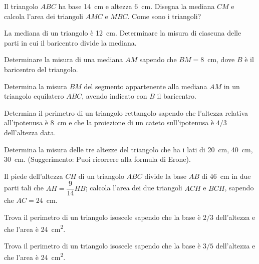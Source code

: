 \begin{multicols}{2}
\begin{esercizio}
\label{ese:7.73}
Il triangolo $ABC$ ha base 14~cm e altezza 6~cm. Disegna la mediana 
$CM$ e calcola l'area dei triangoli $AMC$ e $MBC$. Come sono i 
triangoli?
\end{esercizio}

\begin{esercizio}
\label{ese:7.74}
La mediana di un triangolo è 12~cm. Determinare la misura di ciascuna 
delle parti in cui il baricentro divide la mediana.
\end{esercizio}

\begin{esercizio}
\label{ese:7.75}
Determinare la misura di una mediana $AM$ sapendo che $BM=8$~cm, dove 
$B$ è il baricentro del triangolo.
\end{esercizio}

\begin{esercizio}
\label{ese:7.76}
Determina la misura $BM$ del segmento appartenente alla mediana $AM$ 
in un triangolo equilatero $ABC$, avendo indicato con $B$ il 
baricentro. 
\end{esercizio}

\begin{esercizio}
\label{ese:7.77}
Determina il perimetro di un triangolo rettangolo sapendo che 
l'altezza relativa all'ipotenusa è 8~cm e che la proiezione di un 
cateto sull'ipotenusa è $4/3$ dell'altezza data.
\end{esercizio}

\begin{esercizio}
\label{ese:7.78}
Determina la misura delle tre altezze del triangolo che ha i lati di 
20~cm, 40~cm, 30~cm. (Suggerimento: Puoi ricorrere alla formula di 
Erone).
\end{esercizio}

\begin{esercizio}
\label{ese:7.79}
Il piede dell'altezza $CH$ di un triangolo $ABC$ divide la base $AB$ 
di 46~cm in due parti tali che $AH=\dfrac{9}{14}HB$; calcola l'area 
dei due triangoli $ACH$ e $BCH$, sapendo che $AC=24$~cm.
\end{esercizio}

\begin{esercizio}
\label{ese:7.80}
Trova il perimetro di un triangolo isoscele sapendo che la base è 
$2/3$ dell'altezza e che l'area è 24~cm\textsuperscript{2}.
\end{esercizio}

\begin{esercizio}
\label{ese:7.81}
Trova il perimetro di un triangolo isoscele sapendo che la base è 
$3/5$ dell'altezza e che l'area è 24~cm\textsuperscript{2}.
\end{esercizio}


\end{multicols}
